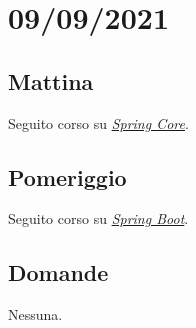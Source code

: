 \section{09/09/2021}
\subsection{Mattina}
Seguito corso su \textit{\href{https://www.youtube.com/watch?v=ZwcHeLhvuq4}{Spring Core}}.
\subsection{Pomeriggio}
Seguito corso su \textit{\href{https://www.youtube.com/watch?v=9SGDpanrc8U}{Spring Boot}}.
\subsection{Domande}
Nessuna.

